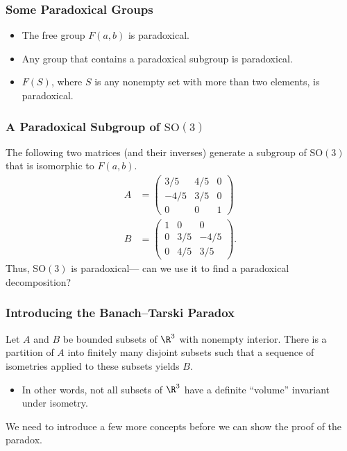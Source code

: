 \documentclass{beamer-custom}
\begin{document}
\begin{frame}
  \frametitle{Some Paradoxical Groups}
  \begin{itemize}
    \item The free group $F(a,b)$ is paradoxical.\pause
    \item Any group that contains a paradoxical subgroup is paradoxical.\pause
    \item $F(S)$, where $S$ is any nonempty set with more than two elements, is paradoxical.
  \end{itemize}
\end{frame}
\begin{frame}
  \frametitle{A Paradoxical Subgroup of $\text{SO}(3)$}
  The following two matrices (and their inverses) generate a subgroup of $\text{SO}(3)$ that is isomorphic to $F(a,b)$.
  \begin{align*}
    A &= \begin{pmatrix}3/5 & 4/5 & 0 \\  -4/5 & 3/5 & 0 \\ 0 & 0 & 1\end{pmatrix}\\
    B &= \begin{pmatrix}1 & 0 & 0 \\ 0 & 3/5 & -4/5 \\ 0 & 4/5 & 3/5\end{pmatrix}.
  \end{align*}\pause
  Thus, $\text{SO}(3)$ is paradoxical\pause\:--- can we use it to find a paradoxical decomposition?
\end{frame}
\begin{frame}
  \frametitle{Introducing the Banach--Tarski Paradox}
  \begin{theorem}
    Let $A$ and $B$ be bounded subsets of $\R^3$ with nonempty interior. There is a partition of $A$ into finitely many disjoint subsets such that a sequence of isometries applied to these subsets yields $B$.
  \end{theorem}\pause
  \begin{itemize}
    \item In other words, not all subsets of $\R^3$ have a definite ``volume'' invariant under isometry.\pause
  \end{itemize}
  We need to introduce a few more concepts before we can show the proof of the paradox.
\end{frame}
\end{document}
